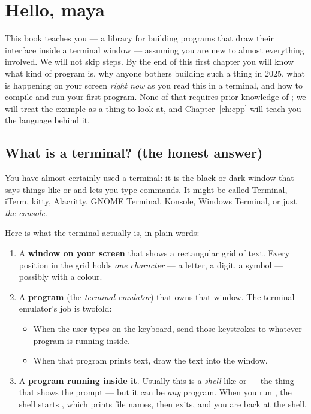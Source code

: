 \chapter{Hello, maya}
\label{ch:intro}

This book teaches you \maya{} --- a library for building programs that
draw their interface inside a terminal window --- assuming you are new
to almost everything involved. We will not skip steps. By the end of
this first chapter you will know what kind of program \maya{} is, why
anyone bothers building such a thing in 2025, what is happening on
your screen \emph{right now} as you read this in a terminal, and how
to compile and run your first \maya{} program. None of that requires
prior knowledge of \cpp{}; we will treat the example as a thing to
look at, and Chapter~\ref{ch:cpp} will teach you the language behind
it.

\section{What is a terminal? (the honest answer)}

You have almost certainly used a terminal: it is the black-or-dark
window that says things like \code{\$} or \code{>} and lets you type
commands. It might be called Terminal, iTerm, kitty, Alacritty, GNOME
Terminal, Konsole, Windows Terminal, or just \emph{the console}.

Here is what the terminal actually is, in plain words:

\begin{enumerate}[leftmargin=*]
  \item A \textbf{window on your screen} that shows a rectangular grid
    of text. Every position in the grid holds \emph{one character} ---
    a letter, a digit, a symbol --- possibly with a colour.
  \item A \textbf{program} (the \emph{terminal emulator}) that owns
    that window. The terminal emulator's job is twofold:
    \begin{itemize}[leftmargin=*]
      \item When the user types on the keyboard, send those keystrokes
        to whatever program is running inside.
      \item When that program prints text, draw the text into the
        window.
    \end{itemize}
  \item A \textbf{program running inside it}. Usually this is a
    \emph{shell} like  or  --- the thing that
    shows the \code{\$} prompt --- but it can be \emph{any} program.
    When you run , the shell starts , which prints
    file names, then exits, and you are back at the shell.
\end{enumerate}

